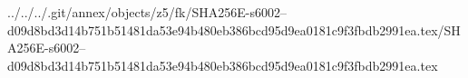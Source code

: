 ../../../.git/annex/objects/z5/fk/SHA256E-s6002--d09d8bd3d14b751b51481da53e94b480eb386bcd95d9ea0181c9f3fbdb2991ea.tex/SHA256E-s6002--d09d8bd3d14b751b51481da53e94b480eb386bcd95d9ea0181c9f3fbdb2991ea.tex